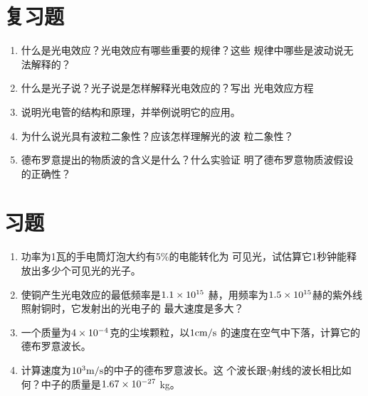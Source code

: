 \section*{复习题}
\begin{enumerate}
\item 什么是光电效应？光电效应有哪些重要的规律？这些
规律中哪些是波动说无法解释的？
\item 什么是光子说？光子说是怎样解释光电效应的？写出
光电效应方程
\item 说明光电管的结构和原理，并举例说明它的应用。
\item 为什么说光具有波粒二象性？应该怎样理解光的波
粒二象性？
\item 德布罗意提出的物质波的含义是什么？什么实验证
明了德布罗意物质波假设的正确性？
\end{enumerate}

\section*{习题}
\begin{enumerate}
    \item 功率为1瓦的手电筒灯泡大约有5\%的电能转化为
可见光，试估算它1秒钟能释放出多少个可见光的光子。
\item 使铜产生光电效应的最低频率是$1.1\times10^{15}$
赫，用频率为$1.5\times10^{15}$赫的紫外线照射铜时，它发射出的光电子的
最大速度是多大？
\item 一个质量为$4\times10^{-4}$克的尘埃颗粒，以$1{\rm cm}/{\rm s}$
的速度在空气中下落，计算它的德布罗意波长。
\item 计算速度为$10^3\text{m}/\text{s}$的中子的德布罗意波长。这
个波长跟$\gamma$射线的波长相比如何？中子的质量是$1.67\times10^{-27}$
kg。
\end{enumerate}






















